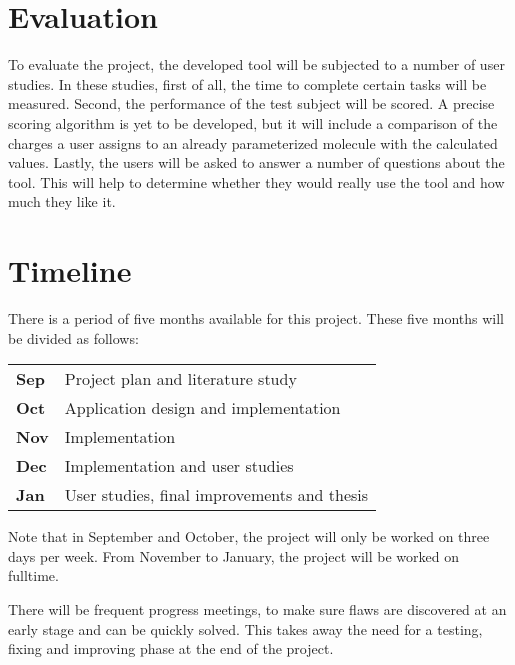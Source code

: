 \section{Evaluation}

To evaluate the project, the developed tool will be subjected to a number of user studies. In these studies, first of all, the time to complete certain tasks will be measured. Second, the performance of the test subject will be scored. A precise scoring algorithm is yet to be developed, but it will include a comparison of the charges a user assigns to an already parameterized molecule with the calculated values. Lastly, the users will be asked to answer a number of questions about the tool. This will help to determine whether they would really use the tool and how much they like it.


\section{Timeline}

There is a period of five months available for this project. These five months will be divided as follows:

\begin{tabular}{l|l}
\textbf{Sep} & Project plan and literature study\\
\textbf{Oct} & Application design and implementation\\
\textbf{Nov} & Implementation\\
\textbf{Dec} & Implementation and user studies\\
\textbf{Jan} & User studies, final improvements and thesis
\end{tabular}

\noindent
Note that in September and October, the project will only be worked on three days per week. From November to January, the project will be worked on fulltime.

There will be frequent progress meetings, to make sure flaws are discovered at an early stage and can be quickly solved. This takes away the need for a testing, fixing and improving phase at the end of the project.
